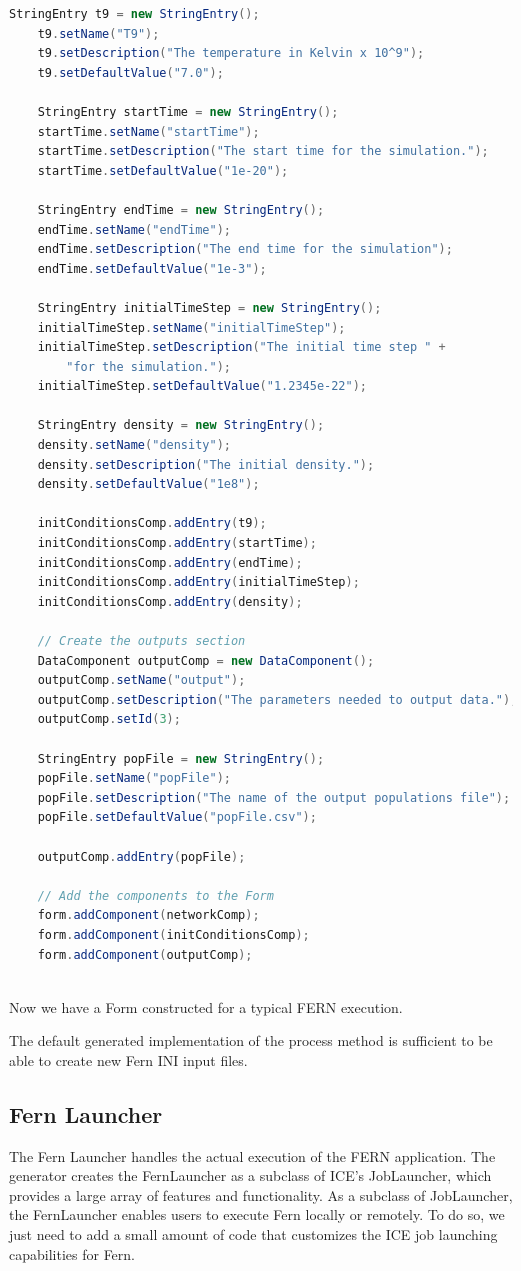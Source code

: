 \begin{lstlisting}[language=Java]
    StringEntry t9 = new StringEntry();
    t9.setName("T9");
    t9.setDescription("The temperature in Kelvin x 10^9");
    t9.setDefaultValue("7.0");

    StringEntry startTime = new StringEntry();
    startTime.setName("startTime");
    startTime.setDescription("The start time for the simulation.");
    startTime.setDefaultValue("1e-20");

    StringEntry endTime = new StringEntry();
    endTime.setName("endTime");
    endTime.setDescription("The end time for the simulation");
    endTime.setDefaultValue("1e-3");

    StringEntry initialTimeStep = new StringEntry();
    initialTimeStep.setName("initialTimeStep");
    initialTimeStep.setDescription("The initial time step " + 
    	"for the simulation."); 
    initialTimeStep.setDefaultValue("1.2345e-22");

    StringEntry density = new StringEntry();
    density.setName("density");
    density.setDescription("The initial density.");
    density.setDefaultValue("1e8");
    
    initConditionsComp.addEntry(t9);
    initConditionsComp.addEntry(startTime);
    initConditionsComp.addEntry(endTime);
    initConditionsComp.addEntry(initialTimeStep);
    initConditionsComp.addEntry(density);
    
    // Create the outputs section
    DataComponent outputComp = new DataComponent();
    outputComp.setName("output");
    outputComp.setDescription("The parameters needed to output data.");
    outputComp.setId(3);
    
    StringEntry popFile = new StringEntry();
    popFile.setName("popFile");
    popFile.setDescription("The name of the output populations file");
    popFile.setDefaultValue("popFile.csv");
    
    outputComp.addEntry(popFile);
    
    // Add the components to the Form
    form.addComponent(networkComp);    
    form.addComponent(initConditionsComp);
    form.addComponent(outputComp);
    
\end{lstlisting}

Now we have a Form constructed for a typical FERN execution. 

The default generated implementation of the process method is sufficient to be
able to create new Fern INI input files. 

\subsection{Fern Launcher}
The Fern Launcher handles the actual execution of the FERN application. The
generator creates the FernLauncher as a subclass of ICE's JobLauncher, which
provides a large array of features and functionality. As a subclass of
JobLauncher, the FernLauncher enables users to execute Fern locally or remotely.
To do so, we just need to add a small amount of
code that customizes the ICE job launching capabilities for Fern. 


